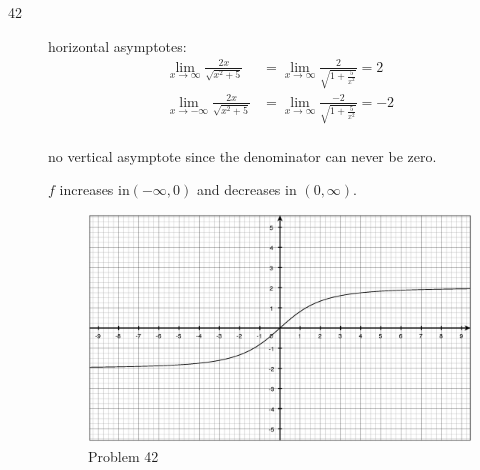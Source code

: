 \documentclass[fleqn]{exam}
\begin{document}
\begin{description}
\pagebreak

\item[42]

horizontal asymptotes:
\begin{align*}
  \lim_{x \to \infty} \frac{2x}{\sqrt{x^2 + 5}} &= \lim_{x \to \infty} \frac{2}{\sqrt{1 + \frac{5}{x^2}}} = 2 \\
  \lim_{x \to -\infty} \frac{2x}{\sqrt{x^2 + 5}} &= \lim_{x \to \infty} \frac{-2}{\sqrt{1 + \frac{5}{x^2}}} = -2 \\
\end{align*}

no vertical asymptote since the denominator can never be zero.

$f$ increases in$(-\infty, 0)$ and decreases in $(0, \infty)$.

\begin{figure}[H]
  \centering
  \includegraphics[scale=.3]{problem_42.eps}
  \caption*{Problem 42}
\end{figure}







\end{description}
\end{document}
